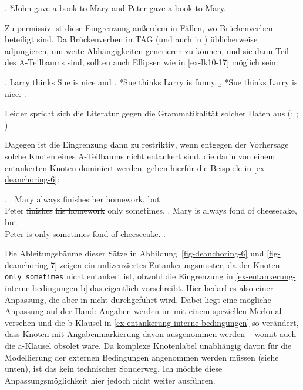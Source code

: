 \ex.  *John gave a book to Mary and Peter \sout{gave a book to Mary}. \hfill
\citep[(13)]{Lichte:Kallmeyer:10}\label{ex-deanchoring-5}

Zu permissiv ist diese Eingrenzung  au\ss erdem in Fällen, wo Brückenverben beteiligt sind. Da  Brückenverben in TAG (und auch in ) üblicherweise adjungieren, um weite Abhängigkeiten generieren zu können, und sie dann Teil des A-Teilbaums sind, sollten auch Ellipsen wie in \ref{ex-lk10-17} möglich sein:    

\ex. Larry thinks Sue is nice and \label{ex-lk10-17}
\a. *Sue \sout{thinks} Larry is funny.
\b. *Sue \sout{thinks} Larry \sout{is nice}.
\z. \citep[(17)]{Lichte:Kallmeyer:10}

Leider spricht sich die Literatur gegen die Grammatikalität solcher Daten aus (\citealt[198]{Sag:76}; \citealt[18]{Johnson:04}; \citealt[1149]{Osborne:08}). 

Dagegen ist die Eingrenzung dann zu restriktiv, wenn entgegen der Vorhersage solche Knoten eines A-Teilbaums nicht entankert sind, die darin von einem entankerten Knoten dominiert werden. \cite{Lichte:Kallmeyer:10} geben hierfür die Beispiele in \ref{ex-deanchoring-6}:   

\ex. \label{ex-deanchoring-6}
\a. Mary always finishes her homework, but \\
Peter \sout{finishes}  \sout{his homework} only sometimes. \label{ex-deanchoring-6-a}
\b. Mary is always fond of cheesecake, but \\
Peter \sout{is} only sometimes \sout{fond of cheesecake}. \label{ex-deanchoring-6-b}
\z. \citep[(14),(15)]{Lichte:Kallmeyer:10}

Die Ableitungsbäume dieser Sätze in Abbildung~\ref{fig-deanchoring-6} und \ref{fig-deanchoring-7} zeigen ein unlizenziertes Ent\-ankerungsmuster, da der Knoten {\tt only\_sometimes} nicht entankert ist, obwohl die Eingrenzung in \ref{ex-entankerung-interne-bedingungen-b} das eigentlich vorschreibt. Hier bedarf es also einer Anpassung, die aber in \cite{Lichte:Kallmeyer:10} nicht durchgeführt wird. Dabei liegt eine mögliche Anpassung auf der Hand: Angaben werden im  mit einem speziellen Merkmal versehen und die b-Klausel in \ref{ex-entankerung-interne-bedingungen} so verändert, dass Knoten mit Angabenmarkierung davon ausgenommen werden -- womit auch die a-Klausel obsolet wäre. Da komplexe Knotenlabel unabhängig davon für die Modellierung der externen Bedingungen  angenommen werden müssen (siehe unten), ist das kein technischer Sonderweg. Ich möchte diese Anpassungsmöglichkeit hier jedoch nicht weiter ausführen.

